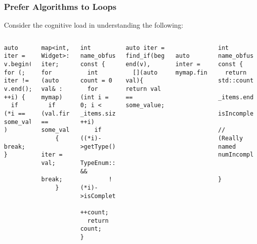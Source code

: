\begin{frame}[fragile]
\frametitle{Prefer Algorithms to Loops}
Consider the cognitive load in understanding the following:
\begin{columns}[t]
\pause{}
{\scriptsize\begin{verbatim}
auto iter = v.begin();
for (; iter != v.end(); ++i) {
  if (*i == some_value    )
   break;
}
\end{verbatim}
}
\pause{}
{\scriptsize\begin{verbatim}
map<int, Widget>::iterator iter;
for (auto val& : mymap)
  if (val.first == some_value)
    {
       iter = val;
       break;
    }
\end{verbatim}
}
\pause{}
{\scriptsize\begin{verbatim}
int name_obfuscated() const {
  int count = 0
  for (int i = 0; i < _items.size; ++i)
    if ((*i)->getType()== 
           TypeEnum::Wocket &&
        !(*i)->isComplete())
     ++count;
  return count;
} 
\end{verbatim}
}
\pause
{\scriptsize\begin{verbatim}
auto iter = find_if(begin(v), end(v),      
  [](auto val){ return val == some_value;});
          

\end{verbatim}
}
\pause{}
{\scriptsize\begin{verbatim}

auto inter = mymap.find(some_value);






\end{verbatim}
}
{\scriptsize\begin{verbatim}
int name_obfuscated() const {
  return std::count_if(_items.begin(), 
                       _items.end(), 
               isIncompleteWocket());

// (Really named numIncompleteWockets)


}
\end{verbatim}
} 
\end{columns}

\end{frame}



